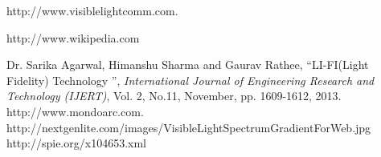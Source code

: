 \begin{thebibliography}{1}
http://www.visiblelightcomm.com.

http://www.wikipedia.com

 Dr. Sarika Agarwal, Himanshu Sharma and Gaurav Rathee, ``LI-FI(Light Fidelity) Technology '', \emph{International Journal of Engineering Research and Technology (IJERT)}, Vol. 2, No.11, November, pp. 1609-1612, 2013.
http://www.mondoarc.com.
http://nextgenlite.com/images/VisibleLightSpectrumGradientForWeb.jpg
http://spie.org/x104653.xml







\end{thebibliography} 
